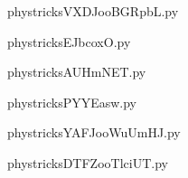     \newcommand{\CaptionFigVXDJooBGRpbL}{<+Type your caption here+>}
    \begin{center}
        
    \end{center}
    phystricksVXDJooBGRpbL.py

    

    \clearpage
    


    \newcommand{\CaptionFigEJbcoxO}{<+Type your caption here+>}
    \begin{center}
        
    \end{center}
    phystricksEJbcoxO.py

    

    \clearpage
    


    \newcommand{\CaptionFigAUHmNET}{<+Type your caption here+>}
    \begin{center}
        
    \end{center}
    phystricksAUHmNET.py

    

    \clearpage
    


    \newcommand{\CaptionFigPYYEasw}{<+Type your caption here+>}
    \begin{center}
        
    \end{center}
    phystricksPYYEasw.py

    

    \clearpage
    


    \newcommand{\CaptionFigYAFJooWuUmHJ}{<+Type your caption here+>}
    \begin{center}
        
    \end{center}
    phystricksYAFJooWuUmHJ.py

    

    \clearpage
    


    \newcommand{\CaptionFigDTFZooTlciUT}{<+Type your caption here+>}
    \begin{center}
        
    \end{center}
    phystricksDTFZooTlciUT.py

